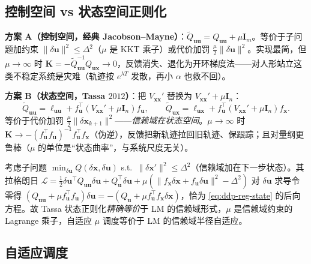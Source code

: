 \subsection{控制空间 vs 状态空间正则化}
\label{sec:ddp-reg-two}

\textbf{方案 A（控制空间，经典 Jacobson--Mayne）}：$\tilde Q_{\mathbf{uu}}=Q_{\mathbf{uu}}+\mu\mathbf{I}_m$。等价于子问题加约束 $\|\delta\mathbf{u}\|^2\le\Delta^2$（$\mu$ 是 KKT 乘子）或代价加罚 $\tfrac{\mu}2\|\delta\mathbf{u}\|^2$。实现最简，但 $\mu\to\infty$ 时 $\mathbf{K}=-\tilde Q_{\mathbf{uu}}^{-1}Q_{\mathbf{ux}}\to0$，反馈消失、退化为开环梯度法——对人形站立这类不稳定系统是灾难（轨迹按 $e^{\lambda T}$ 发散，再小 $\alpha$ 也救不回）。

\textbf{方案 B（状态空间，Tassa $2012$）}：把 $V_{\mathbf{xx}}'$ 替换为 $V_{\mathbf{xx}}'+\mu\mathbf{I}_n$：
\begin{equation}
  \tilde Q_{\mathbf{uu}}=\ell_{\mathbf{uu}}+f_{\mathbf{u}}^\top(V_{\mathbf{xx}}'+\mu\mathbf{I}_n)f_{\mathbf{u}},\qquad
  \tilde Q_{\mathbf{ux}}=\ell_{\mathbf{ux}}+f_{\mathbf{u}}^\top(V_{\mathbf{xx}}'+\mu\mathbf{I}_n)f_{\mathbf{x}}.
  \label{eq:ddp-reg-state}
\end{equation}
等价于代价加罚 $\tfrac{\mu}2\|\delta\mathbf{x}_{k+1}\|^2$——\emph{信赖域在状态空间}。$\mu\to\infty$ 时 $\mathbf{K}\to-(f_{\mathbf{u}}^\top f_{\mathbf{u}})^{-1}f_{\mathbf{u}}^\top f_{\mathbf{x}}$（伪逆），反馈把新轨迹拉回旧轨迹、保跟踪；且对量纲更鲁棒（$\mu$ 的单位是“状态曲率”，与系统尺度无关）。

\begin{theorem}
\label{thm:ddp-lm}
考虑子问题 $\min_{\delta\mathbf{u}}Q(\delta\mathbf{x},\delta\mathbf{u})$ s.t.\ $\|\delta\mathbf{x}'\|^2\le\Delta^2$（信赖域加在下一步状态）。其拉格朗日 $\mathcal{L}=\tfrac12\delta\mathbf{u}^\top Q_{\mathbf{uu}}\delta\mathbf{u}+Q_{\mathbf{u}}^\top\delta\mathbf{u}+\mu(\|f_{\mathbf{x}}\delta\mathbf{x}+f_{\mathbf{u}}\delta\mathbf{u}\|^2-\Delta^2)$ 对 $\delta\mathbf{u}$ 求导令零得 $(Q_{\mathbf{uu}}+\mu f_{\mathbf{u}}^\top f_{\mathbf{u}})\delta\mathbf{u}=-(Q_{\mathbf{u}}+\mu f_{\mathbf{u}}^\top f_{\mathbf{x}}\delta\mathbf{x})$，恰为 \cref{eq:ddp-reg-state} 的后向方程。故 Tassa 状态正则化\emph{精确等价}于 LM 的信赖域形式，$\mu$ 是信赖域约束的 Lagrange 乘子，自适应 $\mu$ 调度等价于 LM 的信赖域半径自适应。
\end{theorem}

\subsection{自适应调度}
\label{sec:ddp-reg-schedule}

